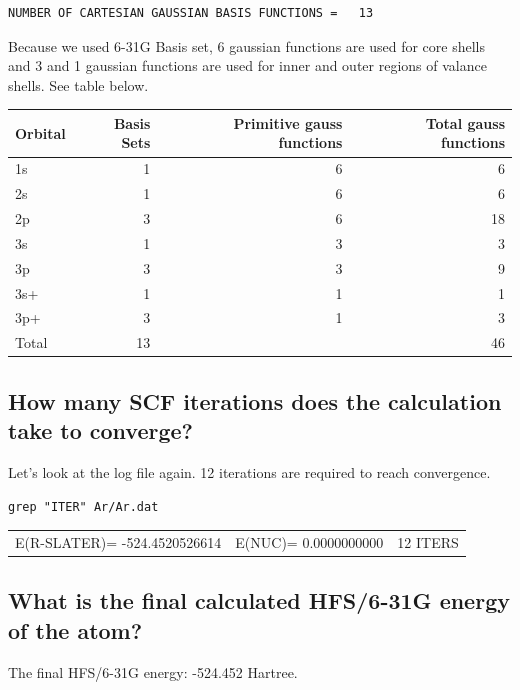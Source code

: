 \documentclass[11pt]{article}
\begin{document}
\begin{verbatim}
NUMBER OF CARTESIAN GAUSSIAN BASIS FUNCTIONS =   13
\end{verbatim}

Because we used 6-31G Basis set, 6 gaussian functions are used for core shells and 3 and 1 gaussian functions are used for inner and outer regions of valance shells. See table below.

\begin{center}
\begin{tabular}{lrrr}
Orbital & Basis Sets & Primitive gauss functions & Total gauss functions\\
\hline
1s & 1 & 6 & 6\\
2s & 1 & 6 & 6\\
2p & 3 & 6 & 18\\
3s & 1 & 3 & 3\\
3p & 3 & 3 & 9\\
3s+ & 1 & 1 & 1\\
3p+ & 3 & 1 & 3\\
\hline
Total & 13 &  & 46\\
\end{tabular}
\end{center}

\subsection{How many SCF iterations does the calculation take to converge?}
\label{sec:org8d38e84}

Let's look at the log file again. 12 iterations are required to reach convergence.

\begin{verbatim}
grep "ITER" Ar/Ar.dat
\end{verbatim}

\begin{center}
\begin{tabular}{lll}
E(R-SLATER)=     -524.4520526614 & E(NUC)=    0.0000000000 & 12 ITERS\\
\end{tabular}
\end{center}

\subsection{What is the final calculated HFS/6-31G energy of the atom?}
\label{sec:orgcd32e63}

The final HFS/6-31G energy: -524.452 Hartree.
\end{document}
